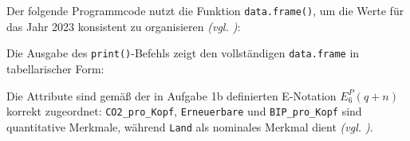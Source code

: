 Der folgende Programmcode nutzt die Funktion \texttt{data.frame()}, um die Werte für das Jahr 2023 konsistent zu organisieren \textit{(\acs{vgl.} \cite[16, 60]{3})}:

\begin{minipage}[t]{0.48\textwidth}
    
\end{minipage}
\hfill
\begin{minipage}[t]{0.48\textwidth}
    
\end{minipage}%
\vspace{-2\baselineskip}%
\captionsetup{hypcap=false}%
%
\label{lst:df-erstellung}%

Die Ausgabe des \texttt{print()}-Befehls zeigt den vollständigen \texttt{data.frame} in tabellarischer Form:

\begin{minipage}[t]{0.48\textwidth}
    
\end{minipage}
\hfill
\begin{minipage}[t]{0.48\textwidth}
    
\end{minipage}%
\vspace{-2\baselineskip}%
\captionsetup{hypcap=false}%
%
\label{lst:df-ausgabe}%

Die Attribute sind gemäß der in Aufgabe 1b definierten \acs{E-Notation} \(E_{6}^{P}(q + n)\) korrekt zugeordnet: \texttt{CO2\_pro\_Kopf}, \texttt{Erneuerbare} und \texttt{BIP\_pro\_Kopf} sind quantitative Merkmale, während \texttt{Land} als nominales Merkmal dient \textit{(\acs{vgl.} \cite[33, 39]{1})}.

